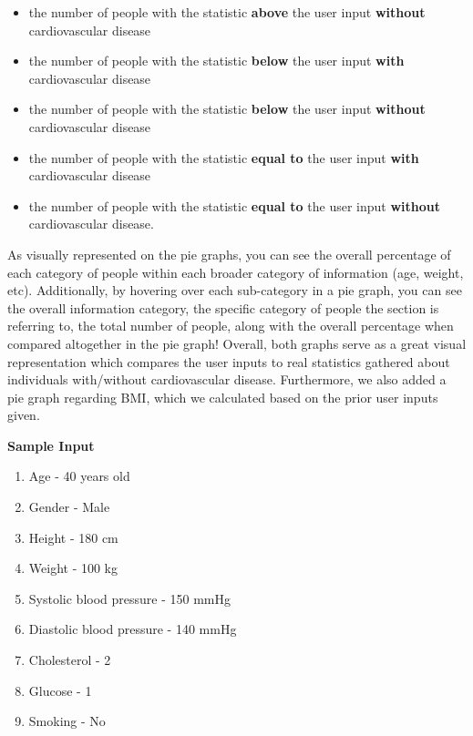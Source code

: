 ﻿\documentclass[12pt]{article}
\begin{document}
\begin{enumerate}
\begin{itemize}
        \item the number of people with the statistic \textbf{above} the user input \textbf{without} cardiovascular disease
        \item the number of people with the statistic \textbf{below} the user input \textbf{with} cardiovascular disease
        \item the number of people with the statistic \textbf{below} the user input \textbf{without} cardiovascular disease
        \item the number of people with the statistic \textbf{equal to} the user input \textbf{with} cardiovascular disease
        \item the number of people with the statistic \textbf{equal to} the user input \textbf{without} cardiovascular disease.
        \end{itemize}

As visually represented on the pie graphs, you can see the overall percentage of each category of people within each broader category of information (age, weight, etc). Additionally, by hovering over each sub-category in a pie graph, you can see the overall information category, the specific category of people the section is referring to, the total number of people, along with the overall percentage when compared altogether in the pie graph! Overall, both graphs serve as a great visual representation which compares the user inputs to real statistics gathered about individuals with/without cardiovascular disease. Furthermore, we also added a pie graph regarding BMI, which we calculated based on the prior user inputs given. 

\vspace{5mm}
\textbf{Sample Input}

\begin{enumerate}
\item Age - 40 years old
\item Gender - Male
\item Height - 180 cm
\item Weight - 100 kg
\item Systolic blood pressure - 150 mmHg
\item Diastolic blood pressure - 140 mmHg
\item Cholesterol - 2
\item Glucose - 1
\item Smoking - No
\end{enumerate}

\end{enumerate}
\end{document}
